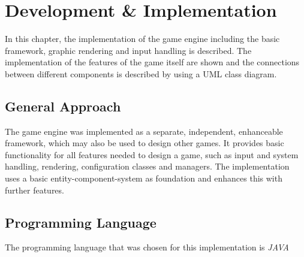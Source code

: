 
\chapter{Development \& Implementation}\label{ch:implementation}
In this chapter, the implementation of the game engine including the basic framework, graphic rendering and input handling is described.
The implementation of the features of the game itself are shown and the connections between different components is described by using a
UML class diagram.

\section{General Approach}\label{sec:general-approach}
The game engine was implemented as a separate, independent, enhanceable framework, which may also be used to design other
games.
It provides basic functionality for all features needed to design a game, such as input and system handling, rendering, configuration
classes and managers.
The implementation uses a basic entity-component-system as foundation and enhances this with further features.

\section{Programming Language}\label{sec:programming-language}
The programming language that was chosen for this implementation is \textit{JAVA} \\

